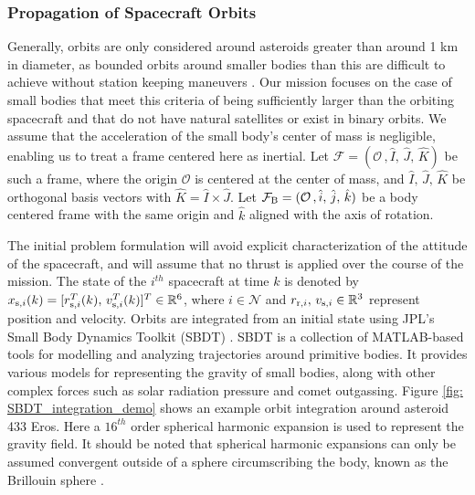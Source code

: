 \documentclass[letterpaper, 10 pt, conference]{ieeeconf}  %
\theoremstyle{definition}
\begin{document}
\subsubsection{Propagation of Spacecraft Orbits}

Generally, orbits are only considered around asteroids greater than around 1 km in diameter, as bounded orbits around smaller bodies than this are difficult to achieve without station keeping maneuvers \cite{stacey2018autonomous}.
Our mission focuses on the case of small bodies that meet this criteria of being sufficiently larger than the orbiting spacecraft and that do not have natural satellites or exist in binary orbits. We assume that the acceleration of the small body's center of mass is negligible, enabling us to treat a frame centered here as inertial. Let $\mathcal{F} = (\mathcal{O}\,,\hat{I},\,\hat{J},\,\hat{K})$ be such a frame, where the origin $\mathcal{O}$ is centered at the center of mass, and $\hat{I},\,\hat{J},\,\hat{K}$ be orthogonal basis vectors with $\hat{K}=\hat{I}\times \hat{J}$. Let $\mathcal{F}_{\rm B}= (\mathcal{O}\,,\hat{i},\,\hat{j},\,\hat{k})$  be a body centered frame with the same origin and $\hat{k}$ aligned with the axis of rotation. 

The initial problem formulation will avoid explicit characterization of the attitude of the spacecraft, and will assume that no thrust is applied over the course of the mission.
The state of the $i^{th}$ spacecraft at time $k$ is denoted by $x_{{\rm s},i}(k) = [r^T_{{\rm s},i}(k), \, v^T_{{\rm s},i}(k) ]^T \in \mathbb{R}^6$, where $i\in\mathcal{N}$ and $r_{{\rm r},i},\,v_{{\rm s},i}\in \mathbb{R}^3$ represent position and velocity. Orbits are integrated from an initial state using JPL's Small Body Dynamics Toolkit (SBDT) \cite{broschart2015small}.
SBDT is a collection of MATLAB-based tools for modelling and analyzing trajectories around primitive bodies. It provides various models for representing the gravity of small bodies, along with other complex forces such as solar radiation pressure and comet outgassing. Figure \ref{fig: SBDT_integration_demo} shows an example orbit integration around asteroid 433 Eros. Here a $16^{th}$ order spherical harmonic expansion is used to represent the gravity field. It should be noted that spherical harmonic expansions can only be assumed convergent outside of a sphere circumscribing the body, known as the Brillouin sphere \cite{scheeres2016orbital}.  
\end{document}
